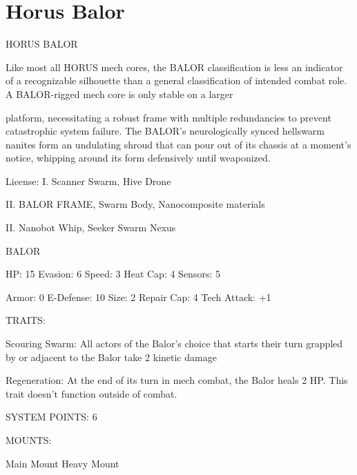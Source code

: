 \section{Horus Balor}
                                                                                                                      


                                           HORUS BALOR  

Like most all HORUS mech cores, the BALOR classification is less an indicator of a recognizable silhouette  
than a general classification of intended combat role. A BALOR-rigged mech core is only stable on a larger  

platform, necessitating a robust frame with multiple redundancies to prevent catastrophic system failure.  
The BALOR’s neurologically synced hellswarm nanites form an undulating shroud that can pour out of its  
chassis at a moment’s notice, whipping around its form defensively until weaponized.  

                                                  License:  
I. Scanner Swarm, Hive Drone
 
II. BALOR FRAME, Swarm Body, Nanocomposite materials
 
II. Nanobot Whip, Seeker Swarm Nexus
 

                                                 BALOR 

 HP: 15         Evasion: 6                           Speed: 3           Heat Cap: 4       Sensors: 5 

 Armor: 0       E-Defense: 10                        Size: 2            Repair Cap: 4     Tech Attack:  
                                                                                          +1 

                                                  TRAITS: 

 Scouring Swarm: All actors of the Balor’s choice that starts their turn grappled by or adjacent to the  
 Balor take 2 kinetic damage
 
 Regeneration: At the end of its turn in mech combat, the Balor heals 2 HP. This trait doesn’t function  
 outside of combat. 

                                            SYSTEM POINTS: 6 

                                                 MOUNTS: 

 Main Mount                                          Heavy Mount 

